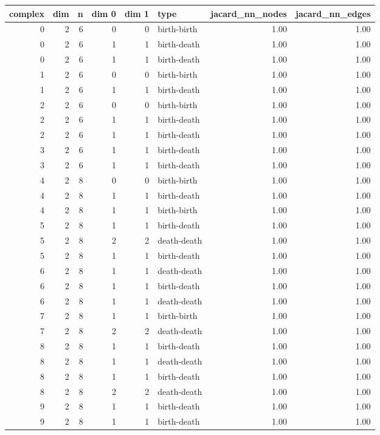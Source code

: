 \documentclass{article}
\begin{document}
\begin{center}
\begin{tabular}{rrrrrlrr}
\toprule
complex & dim & n & dim 0 & dim 1 & type & jacard\_nn\_nodes & jacard\_nn\_edges \\
\midrule
0 & 2 & 6 & 0 & 0 & birth-birth & 1.00 & 1.00 \\
0 & 2 & 6 & 1 & 1 & birth-death & 1.00 & 1.00 \\
0 & 2 & 6 & 1 & 1 & birth-death & 1.00 & 1.00 \\
1 & 2 & 6 & 0 & 0 & birth-birth & 1.00 & 1.00 \\
1 & 2 & 6 & 1 & 1 & birth-death & 1.00 & 1.00 \\
2 & 2 & 6 & 0 & 0 & birth-birth & 1.00 & 1.00 \\
2 & 2 & 6 & 1 & 1 & birth-death & 1.00 & 1.00 \\
2 & 2 & 6 & 1 & 1 & birth-death & 1.00 & 1.00 \\
3 & 2 & 6 & 1 & 1 & birth-death & 1.00 & 1.00 \\
3 & 2 & 6 & 1 & 1 & birth-death & 1.00 & 1.00 \\
4 & 2 & 8 & 0 & 0 & birth-birth & 1.00 & 1.00 \\
4 & 2 & 8 & 1 & 1 & birth-death & 1.00 & 1.00 \\
4 & 2 & 8 & 1 & 1 & birth-birth & 1.00 & 1.00 \\
5 & 2 & 8 & 1 & 1 & birth-death & 1.00 & 1.00 \\
5 & 2 & 8 & 2 & 2 & death-death & 1.00 & 1.00 \\
5 & 2 & 8 & 1 & 1 & birth-death & 1.00 & 1.00 \\
6 & 2 & 8 & 1 & 1 & death-death & 1.00 & 1.00 \\
6 & 2 & 8 & 1 & 1 & birth-death & 1.00 & 1.00 \\
6 & 2 & 8 & 1 & 1 & death-death & 1.00 & 1.00 \\
7 & 2 & 8 & 1 & 1 & birth-birth & 1.00 & 1.00 \\
7 & 2 & 8 & 2 & 2 & death-death & 1.00 & 1.00 \\
8 & 2 & 8 & 1 & 1 & birth-death & 1.00 & 1.00 \\
8 & 2 & 8 & 1 & 1 & death-death & 1.00 & 1.00 \\
8 & 2 & 8 & 1 & 1 & birth-death & 1.00 & 1.00 \\
8 & 2 & 8 & 2 & 2 & death-death & 1.00 & 1.00 \\
9 & 2 & 8 & 1 & 1 & birth-death & 1.00 & 1.00 \\
9 & 2 & 8 & 1 & 1 & birth-death & 1.00 & 1.00 \\

\end{tabular}
\end{center}
\end{document}
